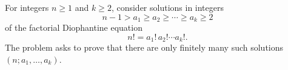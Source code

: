 For integers $n\ge 1$ and $k\ge 2$, consider solutions in integers
\[
 n-1>a_1\ge a_2\ge \cdots \ge a_k\ge 2
\]
of the factorial Diophantine equation
\[
 n! = a_1!\,a_2!\cdots a_k!.
\]
The problem asks to prove that there are only finitely many such solutions $(n; a_1,\dots,a_k)$.
